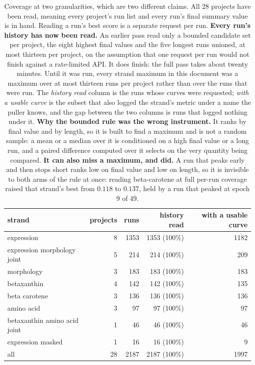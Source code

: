 \begin{table}[htbp]
\centering\small
\begin{tabular}{lrrrr}
\toprule
strand & projects & runs & history read & with a usable curve \\
\midrule
expression & 8 & 1353 & 1353 (100\%) & 1182 \\
expression morphology joint & 5 & 214 & 214 (100\%) & 209 \\
morphology & 3 & 183 & 183 (100\%) & 183 \\
betaxanthin & 4 & 142 & 142 (100\%) & 135 \\
beta carotene & 3 & 136 & 136 (100\%) & 136 \\
amino acid & 3 & 97 & 97 (100\%) & 97 \\
betaxanthin amino acid joint & 1 & 46 & 46 (100\%) & 46 \\
expression masked & 1 & 16 & 16 (100\%) & 9 \\
\midrule
all & 28 & 2187 & 2187 (100\%) & 1997 \\
\bottomrule
\end{tabular}
\caption[]{Coverage at two granularities, which are two different claims. All 28 projects have been read, meaning every project's run list and every run's final summary value is in hand. Reading a run's best score is a separate request per run. \textbf{Every run's history has now been read.} An earlier pass read only a bounded candidate set per project, the eight highest final values and the five longest runs unioned, at most thirteen per project, on the assumption that one request per run would not finish against a rate-limited API. It does finish: the full pass takes about twenty minutes. Until it was run, every strand maximum in this document was a maximum over at most thirteen runs per project rather than over the runs that were run. The \emph{history read} column is the runs whose curves were requested; \emph{with a usable curve} is the subset that also logged the strand's metric under a name the puller knows, and the gap between the two columns is runs that logged nothing under it. \textbf{Why the bounded rule was the wrong instrument.} It ranks by final value and by length, so it is built to find a maximum and is not a random sample: a mean or a median over it is conditioned on a high final value or a long run, and a paired difference computed over it selects on the very quantity being compared. \textbf{It can also miss a maximum, and did.} A run that peaks early and then stops short ranks low on final value and low on length, so it is invisible to both arms of the rule at once: reading beta-carotene at full per-run coverage raised that strand's best from $0.118$ to $0.137$, held by a run that peaked at epoch 9 of 49.}
\label{tab:coverage}
\end{table}
